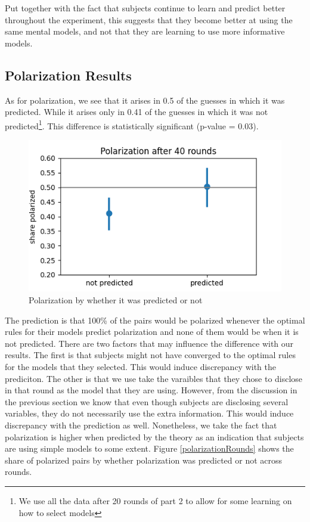 \documentclass[
  12pt,
]{article}
\begin{document}
Put together with the fact that subjects continue to learn and predict
better throughout the experiment, this suggests that they become better
at using the same mental models, and not that they are learning to use
more informative models.

\hypertarget{polarization-results}{%
\subsection{Polarization Results}\label{polarization-results}}

As for polarization, we see that it arises in 0.5 of the guesses in
which it was predicted. While it arises only in 0.41 of the guesses in
which it was not
predicted\footnote{We use all the data after 20 rounds of part 2 to allow for some learning on how to select models}.
This difference is statistically significant (p-value = 0.03).

\begin{figure}

{\centering \includegraphics[width=0.65\linewidth]{../computed_objects/figures/polarization} 

}

\caption{\label{polarization} Polarization by whether it was predicted or not}\label{fig:polarization}
\end{figure}

The prediction is that 100\% of the pairs would be polarized whenever
the optimal rules for their models predict polarization and none of them
would be when it is not predicted. There are two factors that may
influence the difference with our results. The first is that subjects
might not have converged to the optimal rules for the models that they
selected. This would induce discrepancy with the prediciton. The other
is that we use take the varaibles that they chose to disclose in that
round as the model that they are using. However, from the discussion in
the previous section we know that even though subjects are disclosing
several variables, they do not necessarily use the extra information.
This would induce discrepancy with the prediction as well. Nonetheless,
we take the fact that polarization is higher when predicted by the
theory as an indication that subjects are using simple models to some
extent. Figure \ref{polarizationRounds} shows the share of polarized
pairs by whether polarization was predicted or not across rounds.
\end{document}
